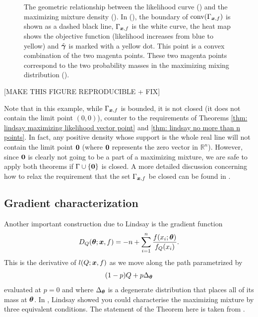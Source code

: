 \begin{figure}[ht]
\begin{minipage}{0.5\textwidth}
			\end{minipage}
			\caption[The geometric relationship between the likelihood curve () and the maximizing mixture density ().]{The geometric relationship between the likelihood curve () and the maximizing mixture density (). In (), the boundary of $\mathrm{conv}(\Gamma_{{\bm{{x}}}, f})$ is shown as a dashed black line, $\Gamma_{{\bm{{x}}}, f}$ is the white curve, the heat map  shows the objective function (likelihood increases from blue to yellow) and $\hat{{\bm{{\gamma}}}}$ is marked with a yellow dot. This point is a convex combination of the two magenta points. These two magenta points correspond to the two probability masses in the maximizing mixing distribution ().}
			\label{fig:GammaSol}
		\end{figure}

		[MAKE THIS FIGURE REPRODUCIBLE + FIX]

		\begin{remark}
			Note that in this example, while $\Gamma_{{\bm{{x}}}, f}$ is bounded, it is not closed (it does not contain the limit point $(0,0)$), counter to the requirements of Theorems \ref{thm: lindsay maximizing likelihood vector point} and \ref{thm: lindsay no more than n points}. In fact, any positive density whose support is the whole real line will not contain the limit point ${\bm{{0}}}$ (where ${\bm{{0}}}$ represents the zero vector in $\mathbb{R}^n$). However, since ${\bm{{0}}}$ is clearly not going to be a part of a maximizing mixture, we are safe to apply both theorems if $\Gamma \cup \{ {\bm{{0}}} \}$ is closed. A more detailed discussion concerning how to relax the requirement that the set $\Gamma_{{\bm{{x}}},f}$ be closed can be found in \cite[Section 5.2.2.]{Lindsay1995-sq}.
		\end{remark}

	\subsection{Gradient characterization}
	\label{sec: gradient characterization}
	Another important construction due to Lindsay is the gradient function
	\begin{equation}
		D_Q({\bm{{\theta}}}; {\bm{{x}}}, f) = -n + \sum_{i = 1}^n \frac{f(x_i;{\bm{{\theta}}})}{f_Q(x_i)}.
		\label{eq:def gradient function}
	\end{equation}
	This is the derivative of $l(Q;{\bm{{x}}},f)$ as we move along the path parametrized by
	\begin{equation}
		(1 - p)Q + p\Delta_{\bm{{\theta}}}
	\end{equation}
	evaluated at $p = 0$ and where $\Delta_{\bm{{\theta}}}$ is a degenerate distribution that places all of its mass at ${\bm{{\theta}}}$. In \cite[Theorem 4.1]{Lindsay1983-tf}, Lindsay showed you could characterise the maximizing mixture by three equivalent conditions. The statement of the Theorem here is taken from \cite[Theorem 19]{Lindsay1995-sq}.

